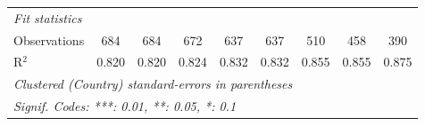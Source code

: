 \begin{tabular}{lcccccccc}
   \midrule \emph{Fit statistics}\\
   Observations                                              & 684           & 684           & 672           & 637            & 637            & 510           & 458          & 390\\  
   R$^2$                                                     & 0.820         & 0.820         & 0.824         & 0.832          & 0.832          & 0.855         & 0.855        & 0.875\\  
   \midrule
   \multicolumn{9}{l}{\emph{Clustered (Country) standard-errors in parentheses}}\\
   \multicolumn{9}{l}{\emph{Signif. Codes: ***: 0.01, **: 0.05, *: 0.1}}\\
\end{tabular}
\par\endgroup


